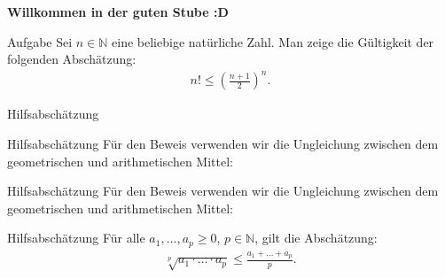 \documentclass[10pt]{beamer}
\title{}
\author{Artur's Mathematikstübchen}
\date{}
\def\bN{\mathbb{N}}
\begin{document}

\begin{frame}
    \begin{center}
        \textbf{\huge Willkommen in der guten Stube \newline \newline :D}
    \end{center}
\end{frame}




\begin{frame}
    \begin{alertblock}{Aufgabe}
        Sei \( n \in \bN \) eine beliebige natürliche Zahl. Man zeige die Gültigkeit der folgenden Abschätzung:
        \begin{align*}
            n! 
            \leq \left( \frac{n + 1}{2} \right)^{n}.
        \end{align*}
    \end{alertblock}
\end{frame}



\begin{frame}{Hilfsabschätzung}
    
\end{frame}



\begin{frame}{Hilfsabschätzung}
    Für den Beweis verwenden wir die Ungleichung zwischen dem geometrischen und arithmetischen Mittel:
\end{frame}



\begin{frame}{Hilfsabschätzung}
    Für den Beweis verwenden wir die Ungleichung zwischen dem geometrischen und arithmetischen Mittel:
    \begin{block}{Hilfsabschätzung}
        Für alle \( a_{1}, \ldots, a_{p} \geq 0 \), \( p \in \bN \), gilt die Abschätzung:
        \begin{align*}
            \sqrt[p]{a_{1} \cdot \ldots \cdot a_{p}} 
            \leq \frac{a_{1} + \ldots + a_{p}}{p}.
        \end{align*}
    \end{block}
\end{frame}
\end{document}
